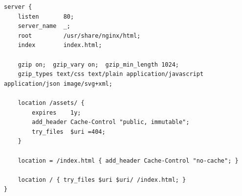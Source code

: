 \begin{lstlisting}[language=Nginx]
server {
    listen       80;
    server_name  _;
    root         /usr/share/nginx/html;
    index        index.html;

    gzip on;  gzip_vary on;  gzip_min_length 1024;
    gzip_types text/css text/plain application/javascript application/json image/svg+xml;

    location /assets/ {
        expires    1y;
        add_header Cache-Control "public, immutable";
        try_files  $uri =404;
    }

    location = /index.html { add_header Cache-Control "no-cache"; }

    location / { try_files $uri $uri/ /index.html; }
}
\end{lstlisting}
